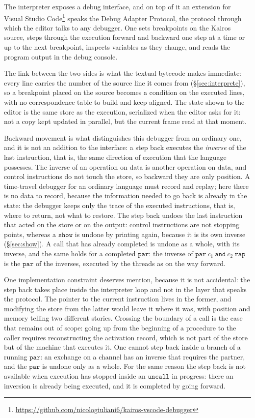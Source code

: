 The interpreter exposes a debug interface, and on top of it an extension for
Visual Studio Code\footnote{\url{https://github.com/nicologiuliani6/kairos-vscode-debugger}}
speaks the Debug Adapter Protocol, the protocol through which the editor talks to
any debugger. One sets breakpoints on the Kairos source, steps through the execution
forward and backward one step at a time or up to the next
breakpoint, inspects variables as they change, and
reads the program output in the debug console.

The link between the two sides is what the textual bytecode makes immediate:
every line carries the number of the source line it comes from
(\S\ref{sec:interprete}), so a breakpoint placed on the source
becomes a condition on the executed lines, with no correspondence table
to build and keep aligned. The state shown to the editor is the same store as
the execution, serialized when the editor asks for it: not a copy kept
updated in parallel, but the current frame read at that moment.

\medskip
\noindent
Backward movement is what distinguishes this debugger from an ordinary one,
and it is not an addition to the interface: a step back executes the \emph{inverse}
of the last instruction, that is, the same direction of execution that the language
possesses. The inverse of an operation on data is another operation on data, and
control instructions do not touch the store, so backward they are only
position. A time-travel debugger for an ordinary language must
record and replay; here there is no data to record, because
the information needed to go back is already in the state: the debugger keeps only the
trace of the executed instructions, that is, where to return, not what to restore.
The step back undoes the last instruction that acted on the store or
on the output: control instructions are not stopping points, whereas a
$\mathtt{show}$ is undone by printing again, because it is its own inverse
(\S\ref{sec:show}). A call that has already completed is undone as a whole, with its
inverse, and the same holds for a completed $\mathtt{par}$: the inverse of
$\mathtt{par}\ c_1\ \mathtt{and}\ c_2\ \mathtt{rap}$ is the $\mathtt{par}$ of the
inverses, executed by the threads as on the way forward.

One implementation constraint deserves mention, because it is not accidental: the
step back takes place inside the interpreter loop and not in the layer that
speaks the protocol. The pointer to the current instruction lives in the former, and
modifying the store from the latter would leave it where it was, with position and
memory telling two different stories. Crossing the boundary of a
call is the case that remains out of scope: going up from the beginning of a procedure to the
caller requires reconstructing the activation record, which is not part of
the store but of the machine that executes it. One cannot step back inside a branch of a
running $\mathtt{par}$: an exchange on a channel has an
inverse that requires the partner, and the $\mathtt{par}$ is undone only as a whole.
For the same reason the step back is not available when execution has stopped
inside an $\mathtt{uncall}$ in progress: there an inversion is already being executed,
and it is completed by going forward.

